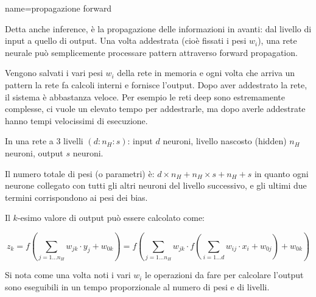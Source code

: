 {
name={propagazione forward}
}{
Detta anche inference, è la propagazione
delle informazioni in avanti: dal livello di input a quello di output.
Una volta addestrata (cioè fissati i pesi \(w_i\)), una rete neurale può semplicemente
processare pattern attraverso forward propagation.

Vengono salvati i vari pesi \(w_i\) della rete in memoria e ogni volta che arriva un pattern la rete fa calcoli interni e fornisce l'output. Dopo aver addestrato la rete, il sistema è abbastanza veloce. Per esempio le reti deep  sono estremamente complesse, ci vuole un elevato tempo per addestrarle, ma dopo averle addestrate hanno tempi velocissimi di esecuzione.

In una rete a 3 livelli \( \left(d: n_{H}: s\right) \):
input \( d \) neuroni, livello nascosto (hidden) \( n_{H} \) neuroni, output \( s \) neuroni.

Il numero totale di pesi (o parametri) è: \( d \times n_{H}+n_{H} \times s+n_{H}+s \) in quanto ogni neurone collegato con tutti gli altri neuroni del livello successivo, e gli ultimi due termini corrispondono ai pesi dei bias.

Il \( k \)-esimo valore di output può essere calcolato come:

\[ z_{k}=f\left(\sum_{j=1 \ldots n_{H}} w_{j k} \cdot y_{j}+w_{0 k}\right)=f\left(\sum_{j=1 \ldots n_{H}} w_{j k} \cdot f\left(\sum_{i=1 \ldots d} w_{i j} \cdot x_{i}+w_{0 j}\right)+w_{0 k}\right) \]

Si nota come una volta noti i vari \(w_i\) le operazioni da fare per calcolare l'output sono eseguibili in un tempo proporzionale al numero di pesi e di livelli.
}


